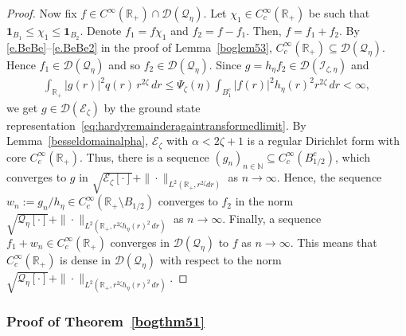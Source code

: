\documentclass[12pt,reqno]{amsart}
\theoremstyle{definition}
\theoremstyle{remark}
\numberwithin{equation}{section}
\newcommand{\1}{\mathbbm{1}}
\newcommand{\D}{\mathcal{D}}
\newcommand{\N}{\mathbb{N}}
\newcommand{\R}{\mathbb{R}}
\def\ce{\mathcal{E}}
\def\ci{\mathcal{I}}
\def\cq{\mathcal{Q}}
\newcommand{\one}{\mathbf{1}}
\begin{document}
\begin{proof}
  Now fix $f\in C^\infty(\R_+)\cap\D(\cq_\eta)$. Let $\chi_1\in C_c^\infty(\R_+)$ be such that $\one_{B_1}\leq\chi_1\leq\one_{B_2}$. Denote $f_1=f\chi_1$ and $f_2=f-f_1$. Then, $f=f_1+f_2$. By \eqref{e.BeBe}--\eqref{e.BeBe2} in the proof of Lemma~\ref{boglem53}, $C_c^\infty(\R_+)\subseteq\D(\cq_\eta)$. Hence $f_1\in\D(\cq_\eta)$ and so $f_2\in\D(\cq_\eta)$. Since $g=h_{\eta}f_2\in\D(\ci_{\zeta,\eta})$ and
  \begin{align}
    \int_{\R_+}|g(r)|^2 q(r)\,r^{2\zeta}\,dr
    \leq \Psi_\zeta(\eta)\int_{B_1^c}|f(r)|^2 h_{\eta}(r)^2 r^{2\zeta}\,dr
    < \infty,
  \end{align}
  we get $g\in\D(\ce_\zeta)$ by the ground state representation~\eqref{eq:hardyremainderagaintransformedlimit}. By Lemma~\ref{besseldomainalpha}, $\ce_\zeta$ with $\alpha<2\zeta+1$ is a regular Dirichlet form with core $C_c^\infty(\R_+)$.
  Thus, there is a sequence $(g_n)_{n\in\N}\subseteq C_c^\infty(B_{1/2}^c)$, which converges to $g$ in $\sqrt{\ce_\zeta[\cdot]}+\|\cdot\|_{L^2(\R_+,r^{2\zeta}dr)}$ as $n\to\infty$. Hence, the sequence $w_n:=g_n/h_{\eta}\in C_c^\infty(\R_+\setminus B_{1/2})$ converges to $f_2$ in the norm $\sqrt{\cq_\eta[\cdot]}+\|\cdot\|_{L^2(\R_+,r^{2\zeta}h_{\eta}(r)^2\,dr)}$ as $n\to\infty$. Finally, a sequence $f_1+w_n\in C_c^\infty(\R_+)$ converges in $\D(\cq_\eta)$ to $f$ as $n\to\infty$. This means that $C_c^\infty(\R_+)$ is dense in $\D(\cq_\eta)$ with respect to the norm $\sqrt{\cq_\eta[\cdot]} + \|\cdot\|_{L^2(\R_+,r^{2\zeta}h_{\eta}(r)^2\,dr)}$.
\end{proof}


\subsubsection{Proof of Theorem~\ref{bogthm51}}
\end{document}
